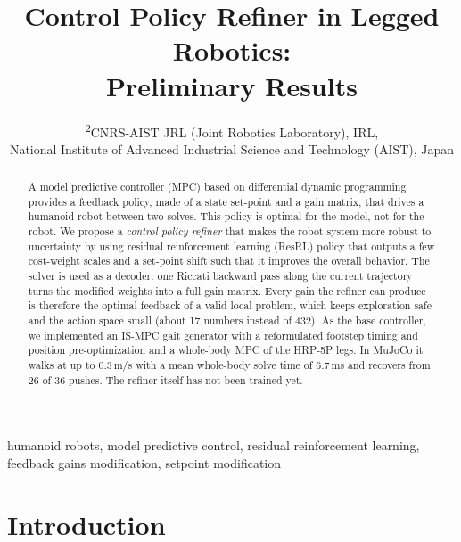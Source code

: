 \documentclass[conference]{IEEEtran}
\begin{document}
\title{Control Policy Refiner in Legged Robotics:\\ Preliminary Results}

\author{
\textsuperscript{2}CNRS-AIST JRL (Joint Robotics Laboratory), IRL,\\
National Institute of Advanced Industrial Science and Technology (AIST), Japan\\
}

\maketitle

\begin{abstract}
A model predictive controller (MPC) based on differential dynamic programming provides a feedback policy, made of a state set-point and a gain matrix, that drives a humanoid robot between two solves.
This policy is optimal for the model, not for the robot.
We propose a \emph{control policy refiner} that makes the robot system more robust to uncertainty by using residual reinforcement learning (ResRL) policy that outputs a few cost-weight scales and a set-point shift such that it improves the overall behavior.
The solver is used as a decoder: one Riccati backward pass along the current trajectory turns the modified weights into a full gain matrix.
Every gain the refiner can produce is therefore the optimal feedback of a valid local problem, which keeps exploration safe and the action space small (about 17 numbers instead of 432).
As the base controller, we implemented an IS-MPC gait generator with a reformulated footstep timing and position pre-optimization and a whole-body MPC of the HRP-5P legs.
In MuJoCo it walks at up to 0.3\,m/s with a mean whole-body solve time of 6.7\,ms and recovers from 26 of 36 pushes.
The refiner itself has not been trained yet.
\end{abstract}

\begin{IEEEkeywords}
humanoid robots, model predictive control, residual reinforcement learning, feedback gains modification, setpoint modification 
\end{IEEEkeywords}

\section{Introduction}
\end{document}
